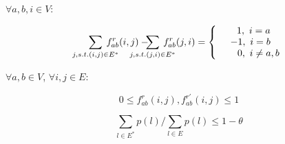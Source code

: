 \documentclass[conference]{IEEEtran}
\begin{document}
\begin{center}
    \vspace{0.1in}
    $\forall a,b,i \in V$: \quad \quad \quad \quad \quad \quad \quad \quad \quad \quad \quad \quad \quad \quad \quad
    \vspace{-0.3in}
\end{center}

\begin{equation}
\label{equation_flow_for_routing}
    \begin{split}
    \sum_{j, s.t.(i,j) \in E^*}\hspace{-0.2in}f^r_{ab}(i,j) - \hspace{-0.3in}\sum_{j, s.t.(j,i) \in E^*}\hspace{-0.2in}f^r_{ab}(j,i) =
    \left\{
        \begin{array}{c}
        \ \ 1, \ i = a \\
        -1, \ i = b \\
        \ \ \ \ \ 0, \ i \neq a,b \\
        \end{array}
    \right.
    \end{split}
\end{equation}

\begin{center}
    \vspace{0.1in}
    $\forall a,b \in V$, $\forall i,j \in E$: \quad \quad \quad \quad \quad \quad \quad \quad \quad \quad \quad
    \vspace{-0.15in}
\end{center}

\begin{equation}
\label{inequation_traffic_fraction}
    0 \leq f^r_{ab}(i,j),f^{r'}_{ab}(i,j) \leq 1
\end{equation}

\begin{equation}
\label{inequation_power_threshold}
    \sum_{l \in E^*} p(l) / \sum_{l \in E} p(l) \leq 1 - \theta
\end{equation}
\end{document}
